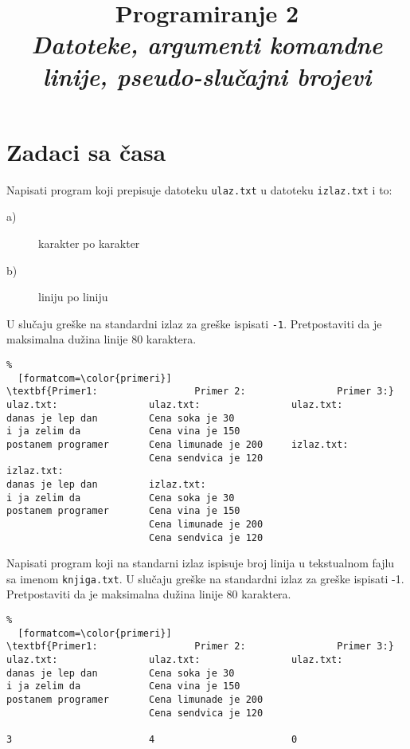 \documentclass{article}
\title{{\bf Programiranje 2\\ \emph{Datoteke, argumenti komandne linije, pseudo-slučajni brojevi}}}
\begin{document}
\maketitle

\section{Zadaci sa časa}

\begin{z}
Napisati program koji prepisuje datoteku \verb|ulaz.txt| u datoteku
\verb|izlaz.txt| i to:
\begin{description}
\item[a)] karakter po karakter
\item[b)] liniju po liniju
\end{description}
U slu\v caju gre\v ske na standardni izlaz za greške ispisati {\tt -1}. Pretpostaviti da je maksimalna dužina linije 80 karaktera.
\end{z}
\begin{Verbatim}%
  [formatcom=\color{primeri}]
\textbf{Primer1:                 Primer 2:                Primer 3:}
ulaz.txt:                ulaz.txt:                ulaz.txt:
danas je lep dan         Cena soka je 30          
i ja zelim da            Cena vina je 150
postanem programer       Cena limunade je 200     izlaz.txt:
                         Cena sendvica je 120
izlaz.txt:
danas je lep dan         izlaz.txt:
i ja zelim da            Cena soka je 30  
postanem programer       Cena vina je 150
                         Cena limunade je 200
                         Cena sendvica je 120
\end{Verbatim}

\begin{z}
Napisati program koji na standarni izlaz ispisuje broj linija u
tekstualnom fajlu sa imenom \verb|knjiga.txt|. U slu\v caju gre\v ske
na standardni izlaz za greške ispisati -1.  Pretpostaviti da je maksimalna dužina linije 80 karaktera.
\end{z}
\begin{Verbatim}%
  [formatcom=\color{primeri}]
\textbf{Primer1:                 Primer 2:                Primer 3:}
ulaz.txt:                ulaz.txt:                ulaz.txt:
danas je lep dan         Cena soka je 30          
i ja zelim da            Cena vina je 150
postanem programer       Cena limunade je 200     
                         Cena sendvica je 120

3                        4                        0
\end{Verbatim}
\end{document}
